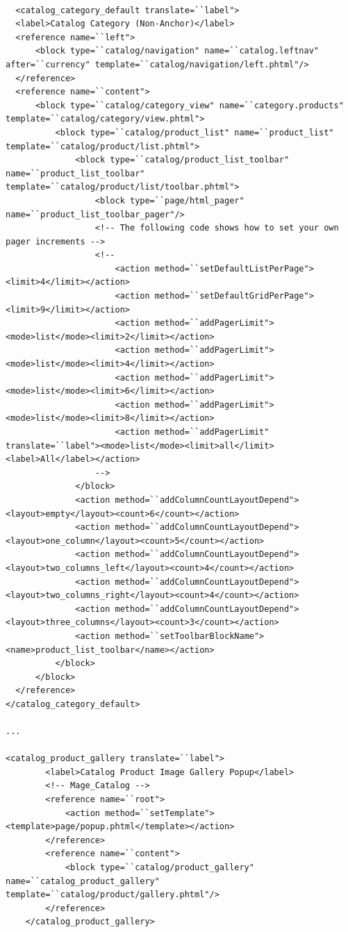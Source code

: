 \vspace{0.5cm}
\lstset{language=XML}
\begin{lstlisting} 

  <catalog_category_default translate=``label">
  <label>Catalog Category (Non-Anchor)</label>
  <reference name=``left">
      <block type=``catalog/navigation" name=``catalog.leftnav" after=``currency" template=``catalog/navigation/left.phtml"/>
  </reference>
  <reference name=``content">
      <block type=``catalog/category_view" name=``category.products" template=``catalog/category/view.phtml">
          <block type=``catalog/product_list" name=``product_list" template=``catalog/product/list.phtml">
              <block type=``catalog/product_list_toolbar" name=``product_list_toolbar" template=``catalog/product/list/toolbar.phtml">
                  <block type=``page/html_pager" name=``product_list_toolbar_pager"/>
                  <!-- The following code shows how to set your own pager increments -->
                  <!--
                      <action method=``setDefaultListPerPage"><limit>4</limit></action>
                      <action method=``setDefaultGridPerPage"><limit>9</limit></action>
                      <action method=``addPagerLimit"><mode>list</mode><limit>2</limit></action>
                      <action method=``addPagerLimit"><mode>list</mode><limit>4</limit></action>
                      <action method=``addPagerLimit"><mode>list</mode><limit>6</limit></action>
                      <action method=``addPagerLimit"><mode>list</mode><limit>8</limit></action>
                      <action method=``addPagerLimit" translate=``label"><mode>list</mode><limit>all</limit><label>All</label></action>
                  -->
              </block>
              <action method=``addColumnCountLayoutDepend"><layout>empty</layout><count>6</count></action>
              <action method=``addColumnCountLayoutDepend"><layout>one_column</layout><count>5</count></action>
              <action method=``addColumnCountLayoutDepend"><layout>two_columns_left</layout><count>4</count></action>
              <action method=``addColumnCountLayoutDepend"><layout>two_columns_right</layout><count>4</count></action>
              <action method=``addColumnCountLayoutDepend"><layout>three_columns</layout><count>3</count></action>
              <action method=``setToolbarBlockName"><name>product_list_toolbar</name></action>
          </block>
      </block>
  </reference>
</catalog_category_default>

...

<catalog_product_gallery translate=``label">
        <label>Catalog Product Image Gallery Popup</label>
        <!-- Mage_Catalog -->
        <reference name=``root">
            <action method=``setTemplate"><template>page/popup.phtml</template></action>
        </reference>
        <reference name=``content">
            <block type=``catalog/product_gallery" name=``catalog_product_gallery" template=``catalog/product/gallery.phtml"/>
        </reference>
    </catalog_product_gallery>


\end{lstlisting}
\vspace{0.5cm}


